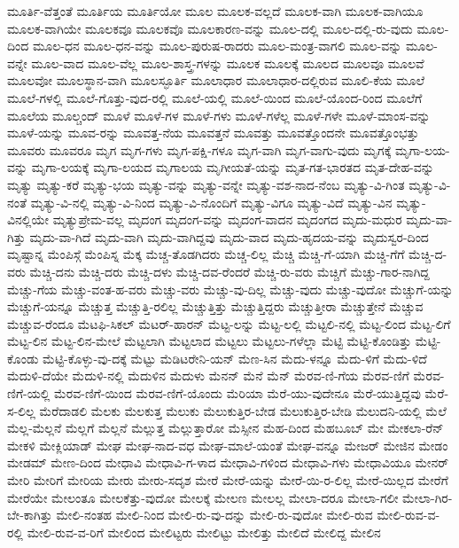 {ಮೂರ್ತಿ-ವೆತ್ತಂತೆ
ಮೂರ್ತಿಯ
ಮೂರ್ತಿಯೋ
ಮೂಲ
ಮೂಲಕ-ವಲ್ಲದೆ
ಮೂಲಕ-ವಾಗಿ
ಮೂಲಕ-ವಾಗಿಯೂ
ಮೂಲಕ-ವಾಗಿಯೇ
ಮೂಲಕವೂ
ಮೂಲಕವೊ
ಮೂಲಕಾರಣ-ವನ್ನು
ಮೂಲ-ದಲ್ಲಿ
ಮೂಲ-ದಲ್ಲಿ-ರು-ವುದು
ಮೂಲ-ದಿಂದ
ಮೂಲ-ಧನ
ಮೂಲ-ಧನ-ವನ್ನು
ಮೂಲ-ಪುರುಷ-ರಾದರು
ಮೂಲ-ಮಂತ್ರ-ವಾಗಲಿ
ಮೂಲ-ವನ್ನು
ಮೂಲ-ವನ್ನೇ
ಮೂಲ-ವಾದ
ಮೂಲ-ವೆಲ್ಲ
ಮೂಲ-ಶಾಸ್ತ್ರ-ಗಳನ್ನು
ಮೂಲಕ
ಮೂಲಕ್ಕೆ
ಮೂಲದ
ಮೂಲವೂ
ಮೂಲವೆ
ಮೂಲವೋ
ಮೂಲಸ್ಥಾನ-ವಾಗಿ
ಮೂಲಸ್ಫೂರ್ತಿ
ಮೂಲಾಧಾರ
ಮೂಲಾಧಾರ-ದಲ್ಲಿರುವ
ಮೂಲಿ-ಕೆಯ
ಮೂಲೆ
ಮೂಲೆ-ಗಳಲ್ಲಿ
ಮೂಲೆ-ಗೊತ್ತು-ವುದ-ರಲ್ಲಿ
ಮೂಲೆ-ಯಲ್ಲಿ
ಮೂಲೆ-ಯಿಂದ
ಮೂಲೆ-ಯೊಂದ-ರಿಂದ
ಮೂಲೆಗೆ
ಮೂಲೆಯ
ಮೂಲ್ಚಂದ್
ಮೂಳೆ
ಮೂಳೆ-ಗಳ
ಮೂಳೆ-ಗಳು
ಮೂಳೆ-ಗಳೆಲ್ಲ
ಮೂಳೆ-ಗಳೇ
ಮೂಳೆ-ಮಾಂಸ-ವನ್ನು
ಮೂಳೆ-ಯನ್ನು
ಮೂವ-ರನ್ನು
ಮೂವತ್ತ-ನೆಯ
ಮೂವತ್ತನೆ
ಮೂವತ್ತು
ಮೂವತ್ತೊಂದನೇ
ಮೂವತ್ತೊಂಭತ್ತು
ಮೂವರು
ಮೂವರೂ
ಮೃಗ
ಮೃಗ-ಗಳು
ಮೃಗ-ಪಕ್ಷಿ-ಗಳೂ
ಮೃಗ-ವಾಗಿ
ಮೃಗ-ವಾಗು-ವುದು
ಮೃಗಕ್ಕೆ
ಮೃಗಾ-ಲಯ-ವನ್ನು
ಮೃಗಾ-ಲಯಕ್ಕೆ
ಮೃಗಾ-ಲಯದ
ಮೃಗಾಲಯ
ಮೃಗೀಯತೆ-ಯನ್ನು
ಮೃತ-ಗತ-ಭಾರತದ
ಮೃತ-ದೇಹ-ವನ್ನು
ಮೃತ್ಯು
ಮೃತ್ಯು-ಕರೆ
ಮೃತ್ಯು-ಭಯ
ಮೃತ್ಯು-ವನ್ನು
ಮೃತ್ಯು-ವನ್ನೇ
ಮೃತ್ಯು-ವಶ-ನಾದ-ನೆಂಬ
ಮೃತ್ಯು-ವಿ-ಗಿಂತ
ಮೃತ್ಯು-ವಿ-ನಂತೆ
ಮೃತ್ಯು-ವಿ-ನಲ್ಲಿ
ಮೃತ್ಯು-ವಿ-ನಿಂದ
ಮೃತ್ಯು-ವಿ-ನೊಂದಿಗೆ
ಮೃತ್ಯು-ವಿಗೂ
ಮೃತ್ಯು-ವಿದೆ
ಮೃತ್ಯು-ವಿನ
ಮೃತ್ಯು-ವಿನಲ್ಲಿಯೇ
ಮೃತ್ಯುಪ್ರೇಮ-ವಲ್ಲ
ಮೃದಂಗ
ಮೃದಂಗ-ವನ್ನು
ಮೃದಂಗ-ವಾದನ
ಮೃದಂಗದ
ಮೃದು-ಮಧುರ
ಮೃದು-ವಾ-ಗಿತ್ತು
ಮೃದು-ವಾ-ಗಿದೆ
ಮೃದು-ವಾಗಿ
ಮೃದು-ವಾಗಿದ್ದವು
ಮೃದು-ವಾದ
ಮೃದು-ಹೃದಯ-ವನ್ನು
ಮೃದುಸ್ವರ-ದಿಂದ
ಮೃಷ್ಟಾನ್ನ
ಮೆಂಪಿಸ್ಗೆ
ಮೆಂಪಿಸ್ನ
ಮೆಕ್ಕ
ಮೆಚ್ಚ-ತೊಡಗಿದರು
ಮೆಚ್ಚ-ಲಿಲ್ಲ
ಮೆಚ್ಚಿ
ಮೆಚ್ಚಿ-ಗೆ-ಯಾಗಿ
ಮೆಚ್ಚಿ-ಗೆಗೆ
ಮೆಚ್ಚಿ-ದ-ವರು
ಮೆಚ್ಚಿ-ದನು
ಮೆಚ್ಚಿ-ದರು
ಮೆಚ್ಚಿ-ದಳು
ಮೆಚ್ಚಿ-ದವ-ರೆಂದರೆ
ಮೆಚ್ಚಿ-ರು-ವರು
ಮೆಚ್ಚಿಗೆ
ಮೆಚ್ಚು-ಗಾರ-ನಾಗಿದ್ದ
ಮೆಚ್ಚು-ಗೆಯ
ಮೆಚ್ಚು-ವಂತ-ಹ-ವರು
ಮೆಚ್ಚು-ವರು
ಮೆಚ್ಚು-ವು-ದಿಲ್ಲ
ಮೆಚ್ಚು-ವುದು
ಮೆಚ್ಚು-ವುದೋ
ಮೆಚ್ಚುಗೆ-ಯನ್ನು
ಮೆಚ್ಚುಗೆ-ಯನ್ನೂ
ಮೆಚ್ಚುತ್ತ
ಮೆಚ್ಚುತ್ತಿ-ರಲಿಲ್ಲ
ಮೆಚ್ಚುತ್ತಿತ್ತು
ಮೆಚ್ಚುತ್ತಿದ್ದರು
ಮೆಚ್ಚುತ್ತೀರಾ
ಮೆಚ್ಚುತ್ತೇನೆ
ಮೆಚ್ಚುವ
ಮೆಚ್ಚುವ-ರೆಂದೂ
ಮೆಟಫಿ-ಸಿಕಲ್
ಮೆಟರ್-ಹಾರನ್
ಮೆಟ್ಟ-ಲನ್ನು
ಮೆಟ್ಟ-ಲಲ್ಲಿ
ಮೆಟ್ಟಲಿ-ನಲ್ಲಿ
ಮೆಟ್ಟ-ಲಿಂದ
ಮೆಟ್ಟ-ಲಿಗೆ
ಮೆಟ್ಟ-ಲಿನ
ಮೆಟ್ಟ-ಲಿನ-ಮೇಲೆ
ಮೆಟ್ಟಲಾಗಿ
ಮೆಟ್ಟಲಾದ
ಮೆಟ್ಟಲು
ಮೆಟ್ಟಲು-ಗಳೆಲ್ಲಾ
ಮೆಟ್ಟಿ
ಮೆಟ್ಟಿ-ಕೊಂಡಿತ್ತು
ಮೆಟ್ಟಿ-ಕೊಂಡು
ಮೆಟ್ಟಿ-ಕೊಳ್ಳು-ವು-ದಕ್ಕೆ
ಮೆಟ್ಟು
ಮೆಡಿಟರೇನಿ-ಯನ್
ಮೆಣ-ಸಿನ
ಮೆದು-ಳನ್ನೂ
ಮೆದು-ಳಿಗೆ
ಮೆದು-ಳಿದೆ
ಮೆದುಳಿ-ದೆಯೇ
ಮೆದುಳಿ-ನಲ್ಲಿ
ಮೆದುಳಿನ
ಮೆದುಳು
ಮೆನನ್
ಮೆನೆ
ಮೆನ್
ಮೆರವ-ಣಿ-ಗೆಯ
ಮೆರವ-ಣಿಗೆ
ಮೆರವ-ಣಿಗೆ-ಯಲ್ಲಿ
ಮೆರವ-ಣಿಗೆ-ಯಿಂದ
ಮೆರವ-ಣಿಗೆ-ಯೊಂದು
ಮೆರಿಯಾ
ಮೆರೆ-ಯು-ವುದೇನೂ
ಮೆರೆ-ಯುತ್ತಿದ್ದವು
ಮೆರೆ-ಸ-ಲಿಲ್ಲ
ಮೆರೆದಾಡಲಿ
ಮೆಲಕು
ಮೆಲಕುತ್ತ
ಮೆಲುಕು
ಮೆಲುಕುತ್ತಿರ-ಬೇಡ
ಮೆಲುಕುತ್ತಿರ-ಬೇಡಿ
ಮೆಲುದನಿ-ಯಲ್ಲಿ
ಮೆಲೆ
ಮೆಲ್ಲ-ಮೆಲ್ಲನೆ
ಮೆಲ್ಲಗೆ
ಮೆಲ್ಲನೆ
ಮೆಲ್ಲುತ್ತ
ಮೆಲ್ಲುತ್ತಾರೋ
ಮೆಸ್ಸೀನ
ಮೆಹ-ದಿಂದ
ಮೆಹಬೂಬ್
ಮೇ
ಮೇಕಲಾ-ರೆನ್
ಮೇಕಳಿ
ಮೇಕ್ಲಿಯಾಡ್
ಮೇಘ
ಮೇಘ-ನಾದ-ವಧ
ಮೇಘ-ಮಾಲೆ-ಯಂತೆ
ಮೇಘ-ವನ್ನೂ
ಮೇಜರ್
ಮೇಜಿನ
ಮೇಡಂ
ಮೇಡಮ್
ಮೇಣ-ದಿಂದ
ಮೇಧಾವಿ
ಮೇಧಾವಿ-ಗ-ಳಾದ
ಮೇಧಾವಿ-ಗಳಿಂದ
ಮೇಧಾವಿ-ಗಳು
ಮೇಧಾವಿಯೂ
ಮೇನರ್
ಮೇರಿ
ಮೇರಿಗೆ
ಮೇರಿಯ
ಮೇರು
ಮೇರು-ಸದೃಶ
ಮೇರೆ
ಮೇರೆ-ಯನ್ನು
ಮೇರೆ-ಯಿ-ರ-ಲಿಲ್ಲ
ಮೇರೆ-ಯಿಲ್ಲದ
ಮೇರೆಗೆ
ಮೇರೆಯೇ
ಮೇಲಂತೂ
ಮೇಲಕೆತ್ತು-ವುದೋ
ಮೇಲಕ್ಕೆ
ಮೇಲಣ
ಮೇಲಲ್ಲ
ಮೇಲಾ-ದರೂ
ಮೇಲಾ-ಗಲೀ
ಮೇಲಾ-ಗಿರ-ಬೇ-ಕಾಗಿತ್ತು
ಮೇಲಿ-ನಂತಹ
ಮೇಲಿ-ನಿಂದ
ಮೇಲಿ-ರು-ವು-ದನ್ನು
ಮೇಲಿ-ರು-ವುದೋ
ಮೇಲಿ-ರುವ
ಮೇಲಿ-ರುವ-ವ-ರಲ್ಲಿ
ಮೇಲಿ-ರುವ-ವ-ರಿಗೆ
ಮೇಲಿಂದ
ಮೇಲಿಟ್ಟರು
ಮೇಲಿಟ್ಟು
ಮೇಲಿತ್ತು
ಮೇಲಿದೆ
ಮೇಲಿದ್ದ
ಮೇಲಿನ
}

